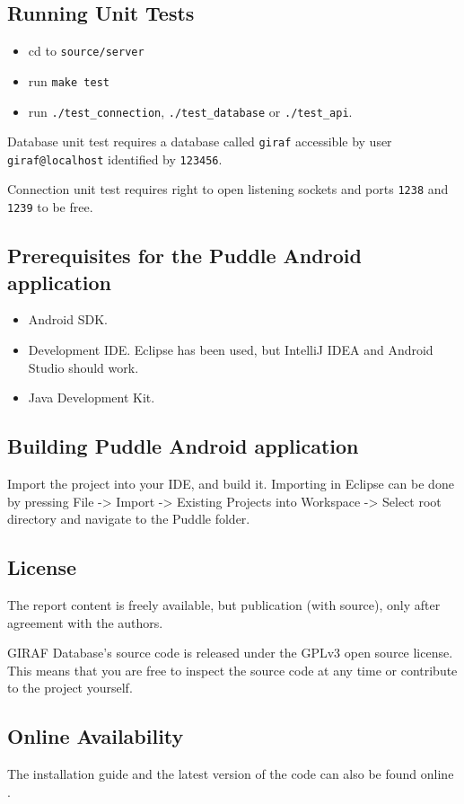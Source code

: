 \subsection{Running Unit Tests}
\begin{itemize}
\item cd to \lstinline|source/server|
\item run \lstinline|make test|
\item run \lstinline|./test_connection|, \lstinline|./test_database| or 
\lstinline|./test_api|.
\end{itemize}
Database unit test requires a database called \lstinline|giraf| accessible by user \lstinline|giraf@localhost| identified by \lstinline|123456|.

Connection unit test requires right to open listening sockets and ports \lstinline|1238| and \lstinline|1239| to be free.

\subsection{Prerequisites for the Puddle Android application}
\begin{itemize}
\item Android SDK.
\item Development IDE. Eclipse has been used, but IntelliJ IDEA and Android Studio should work.
\item Java Development Kit.
\end{itemize}

\subsection{Building Puddle Android application}
Import the project into your IDE, and build it. Importing in Eclipse can be done by pressing File -> Import -> Existing Projects into Workspace -> Select root directory and navigate to the Puddle folder.

\subsection{License}
The report content is freely available, but publication (with source), only after agreement with the authors.

GIRAF Database's source code is released under the GPLv3 \cite{GNUlicense} open source license. This means that you are free to inspect the source code at any time or contribute to the project yourself.

\subsection*{Online Availability} The installation guide and the latest version of the code can also be found online \cite{install}.